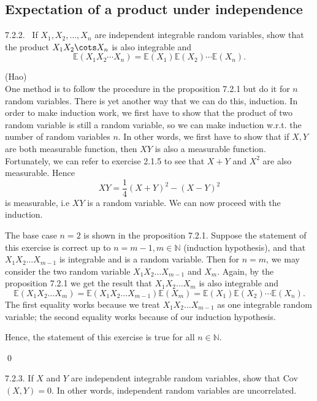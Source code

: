 \subsection{Expectation of a product under independence}

\begin{exercise}7.2.2. \ 
If $X_1, X_2, \dots, X_n$ are independent integrable random variables, show that the product $X_1X_2\cots X_n$ is also integrable and 
$$
    \mathbb{E}(X_1X_2 \cdots X_n) = \mathbb{E}(X_1)\mathbb{E}(X_2)\cdots\mathbb{E}(X_n).
$$
\end{exercise}
\begin{answer} (Hao) \\
    One method is to follow the procedure in the proposition 7.2.1 but do it for $n$ random variables. There is yet another way that we can do this, induction. In order to make induction work, we first have to show that the product of two random variable is still a random variable, so we can make induction w.r.t. the number of random variables $n$. In other words, we first have to show that if $X,Y$ are both measurable function, then $XY$  is also a measurable function. Fortunately, we can refer to exercise 2.1.5 to see that $X+Y$ and $X^2$ are also measurable. Hence
    $$XY = \frac{1}{4}(X+Y)^2 - (X-Y)^2$$ 
    is measurable, i.e $XY$ is a random variable. We can now proceed with the induction.
    
    The base case $n=2$ is shown in the proposition 7.2.1. Suppose the statement of this exercise is correct up to $n = m-1, m \in \mathbb{N}$ (induction hypothesis), and that $X_1X_2 \dots X_{m-1}$ is integrable and is a random variable.
    Then for $n = m$, we may consider the two random variable $X_1X_2 \dots X_{m-1}$ and $X_{m}$. Again, by the proposition 7.2.1 we get the result that $X_1X_2\dots X_m$ is also integrable and 
    $$\mathbb{E}(X_1X_2 \dots X_m) = \mathbb{E}(X_1X_2 \dots X_{m-1}) \mathbb{E}(X_m) =  \mathbb{E}(X_1)\mathbb{E}(X_2)\cdots\mathbb{E}(X_n).$$
    The first equality works because we treat $X_1X_2 \dots X_{m-1}$ as one integrable random variable; the second equality works because of our induction hypothesis.
    
    Hence, the statement of this exercise is true for all $n \in \mathbb{N}$.
\end{answer} \qed \qquad

\begin{exercise} 7.2.3. If $X$ and $Y$ are independent integrable random variables, show that Cov$(X, Y ) = 0$. In other words, independent random variables are
uncorrelated.
\end{exercise}

